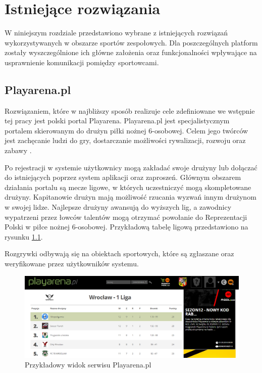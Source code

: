 \chapter{Istniejące rozwiązania}

W niniejszym rozdziale przedstawiono wybrane z istniejących rozwiązań wykorzystywanych w obszarze sportów zespołowych. Dla poszczególnych platform zostały wyszczególnione ich główne założenia oraz funkcjonalności wpływające na usprawnienie komunikacji pomiędzy sportowcami.


\section{Playarena.pl}

Rozwiązaniem, które w najbliższy sposób realizuje cele zdefiniowane we wstępnie tej pracy jest polski portal Playarena. Playarena.pl jest specjalistycznym portalem skierowanym do drużyn piłki nożnej 6-osobowej. Celem jego twórców jest zachęcanie ludzi do gry, dostarczanie możliwości rywalizacji, rozwoju oraz zabawy \cite{playarena}.

Po rejestracji w systemie użytkownicy mogą zakładać swoje drużyny lub dołączać do istniejących poprzez system aplikacji oraz zaproszeń. Głównym obszarem działania portalu są mecze ligowe, w których uczestniczyć mogą skompletowane drużyny. Kapitanowie drużyn mają możliwość rzucania wyzwań innym drużynom w swojej lidze. Najlepsze drużyny awansują do wyższych lig, a zawodnicy wypatrzeni przez łowców talentów mogą otrzymać powołanie do Reprezentacji Polski w piłce nożnej 6-osobowej. Przykładową tabelę ligową przedstawiono na rysunku \ref{fig:ss-playarena}.

Rozgrywki odbywają się na obiektach sportowych, które są zgłaszane oraz weryfikowane przez użytkowników systemu.

\begin{figure}[H]
\centering
\includegraphics[width=\linewidth]{02-istniejace-rozwiazania/rys/playarena.PNG}
\caption{Przykładowy widok serwisu Playarena.pl}
\label{fig:ss-playarena}
\end{figure}


